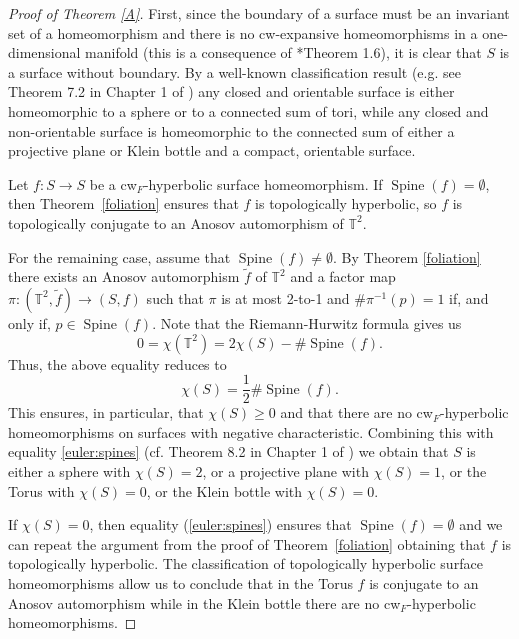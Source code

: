 \documentclass{amsart}
\theoremstyle{plain}
\theoremstyle{definition}
\newcommand{\spine}{\operatorname{Spine}}
\begin{document}
\begin{proof}[Proof of Theorem \ref{A}]
First, since the boundary of a surface must be an invariant set of a homeomorphism and there is no cw-expansive homeomorphisms in a one-dimensional manifold (this is a consequence of \cite{K2}*{Theorem 1.6}), it is clear that $S$ is a surface without boundary. By a well-known classification result (e.g. see Theorem 7.2 in Chapter 1 of \cite{Massey}) any closed and orientable surface is either homeomorphic to a sphere or to a connected sum of tori, while any closed and non-orientable surface is homeomorphic to the connected sum of either a projective plane or Klein bottle and a compact, orientable surface.

Let $f\colon S\to S$ be a cw$_F$-hyperbolic surface homeomorphism. 
If $\spine(f)=\emptyset$, then Theorem~\ref{foliation} ensures that $f$ is topologically hyperbolic, so $f$ is topologically conjugate to an Anosov automorphism of $\mathbb{T}^2$.

For the remaining case, assume that $\spine(f)\neq\emptyset$.
By Theorem \ref{foliation} there exists an Anosov automorphism $\tilde f$ of $\mathbb{T}^2$ and a factor map $\pi\colon (\mathbb{T}^2,\tilde f) \to (S,f)$ such that $\pi$ is at most 2-to-1 and $\# \pi^{-1}(p)=1$ if, and only if, $p\in \spine(f)$.
Note that the Riemann-Hurwitz formula \cite{J} gives us 
$$0=\chi(\mathbb{T}^2)=2\chi(S)-\#\spine(f).$$ 
Thus, the above equality reduces to
\begin{equation}
    \chi(S)=\frac{1}{2}\# \spine(f).
    \label{euler:spines}
\end{equation}
This ensures, in particular, that $\chi(S)\geq0$ and that there are no cw$_F$-hyperbolic homeomorphisms on surfaces with negative characteristic. Combining this with equality \eqref{euler:spines} (cf. Theorem 8.2 in Chapter 1 of \cite{Massey}) we obtain that $S$ is either a sphere with $\chi(S)=2$, or a projective plane with $\chi(S)=1$, or the Torus with $\chi(S)=0$, or the Klein bottle with $\chi(S)=0$.

If $\chi(S)=0$, then  
equality (\ref{euler:spines}) ensures that $\spine(f)=\emptyset$ and we can repeat the argument from the proof of Theorem~\ref{foliation} obtaining that $f$ is topologically hyperbolic. The classification of topologically hyperbolic surface homeomorphisms allow us to conclude that in the Torus $f$ is conjugate to an Anosov automorphism while in the Klein bottle there are no cw$_F$-hyperbolic homeomorphisms. 


\end{proof}
\end{document}
